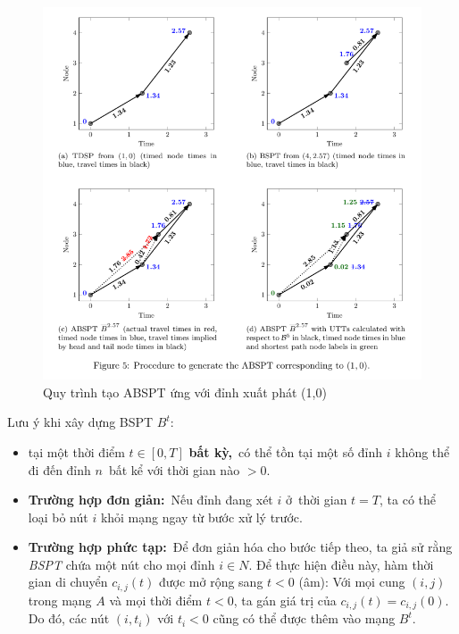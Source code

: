 \documentclass[../main.tex]{subfiles}
\begin{document}
\begin{figure}[H]

\centering
\includegraphics{images/Figure5.png}
\caption{Quy trình tạo ABSPT ứng với
đỉnh xuất phát (1,0)}
\label{fig:5}
\end{figure}

Lưu ý khi xây dựng BSPT \(B^t\):

\begin{itemize}
\tightlist
\item
  tại một thời điểm \(t \in [0, T]\) \textbf{bất kỳ,}~có thể tồn tại một
  số đỉnh \(i\) không thể đi đến đỉnh \(n\)~bất kể với thời gian nào
  \(> 0\).
\item
  \textbf{Trường hợp đơn giản:}~Nếu đỉnh đang xét \(i\) ở~thời gian
  \(t = T\), ta có thể loại bỏ nút \(i\) khỏi mạng ngay từ bước xử lý
  trước.
\item
  \textbf{Trường hợp phức tạp:}~Để đơn giản hóa cho bước tiếp theo, ta
  giả sử rằng \emph{BSPT} chứa một nút cho mọi đỉnh \(i \in N\). Để thực
  hiện điều này, hàm thời gian di chuyển \(c_{i,j}(t)\) được mở rộng
  sang \(t < 0\) (âm): Với mọi cung \((i, j)\) trong mạng \(A\) và mọi
  thời điểm \(t < 0\), ta gán giá trị của \(c_{i,j}(t) = c_{i,j}(0)\).
  Do đó, các nút \((i, t_i)\) với \(t_i<0\) cũng có thể được thêm vào
  mạng \(B^t\).
\end{itemize}
\end{document}
